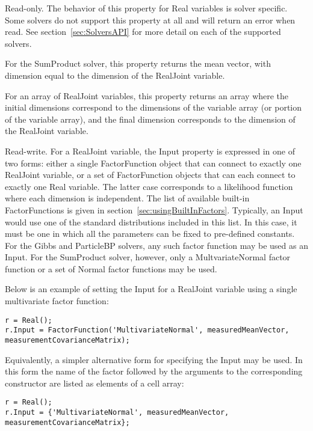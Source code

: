 \label{sec:RealJoint.Value}

Read-only.  The behavior of this property for Real variables is solver specific.  Some solvers do not support this property at all and will return an error when read.  See section~\ref{sec:SolversAPI} for more detail on each of the supported solvers.

For the SumProduct solver, this property returns the mean vector, with dimension equal to the dimension of the RealJoint variable.

\ifmatlab
For an array of RealJoint variables, this property returns an array where the initial dimensions correspond to the dimensions of the variable array (or portion of the variable array), and the final dimension corresponds to the dimension of the RealJoint variable.
\fi

\label{sec:RealJoint.Input}

Read-write.  For a RealJoint variable, the Input property is expressed in one of two forms: either a single FactorFunction object that can connect to exactly one RealJoint variable, or a set of FactorFunction objects that can each connect to exactly one Real variable.  The latter case corresponds to a likelihood function where each dimension is independent.  The list of available built-in FactorFunctions is given in section~\ref{sec:usingBuiltInFactors}.  Typically, an Input would use one of the standard distributions included in this list.  In this case, it must be one in which all the parameters can be fixed to pre-defined constants.  For the Gibbs and ParticleBP solvers, any such factor function may be used as an Input.  For the SumProduct solver, however, only a MultvariateNormal factor function or a set of Normal factor functions may be used.

Below is an example of setting the Input for a RealJoint variable using a single multivariate factor function:

\ifmatlab

\begin{lstlisting}
r = Real();
r.Input = FactorFunction('MultivariateNormal', measuredMeanVector, measurementCovarianceMatrix);
\end{lstlisting}

Equivalently, a simpler alternative form for specifying the Input may be used.  In this form the name of the factor followed by the arguments to the corresponding constructor are listed as elements of a cell array:

\begin{lstlisting}
r = Real();
r.Input = {'MultivariateNormal', measuredMeanVector, measurementCovarianceMatrix};
\end{lstlisting}

